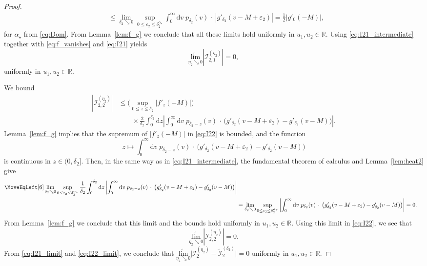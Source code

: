 \documentclass[oneside,final,11pt]{amsart}
\theoremstyle{definition}
\renewcommand{\d}{\mathrm{d}}
\newcommand{\mylim}[1]{\underset{#1}{\wt{\mathrm{lim}}}}
\newcommand{\R}{\mathbb{R}}
\newcommand{\1}[1]{\mathbf{1}_{#1}}
\newcommand{\eps}{\varepsilon}
\newcommand{\wt}{\widetilde}
\newcommand{\CI}{\mathcal{I}}
\numberwithin{equation}{section}
\begin{document}
\begin{proof}
\begin{equation}
\begin{split}
		&\leq \lim_{\delta_2 \searrow 0} \sup_{0 \leq \eps_2 \leq \delta_2^{\alpha_\star}} \int_{0}^{\infty} \d v\;  p_{\delta_2}(v) \,\cdot\, |g'_{\delta_2}(v - M + \eps_2)| = \frac{1}{2} |g'_{0}(- M)|,
	\end{split}\label{eq:I21_intermediate}
\end{equation}
for $\alpha_\star$ from \eqref{eq:Dom}. From Lemma~\ref{lem:f_g} we conclude that all these limits hold uniformly in $u_1, u_2 \in \R$. Using \eqref{eq:I21_intermediate} together with \eqref{eq:f_vanishes} and \eqref{eq:I21} yields
\begin{equation}\label{eq:I21_limit}
	\mylim{\eta_2 \searrow 0} |\CI^{(\eta_2)}_{2,1}| = 0,
\end{equation}
uniformly in $u_1, u_2 \in \R$.

\smallskip
\noindent{\bf The term $\CI^{(\eta_2)}_{2,2}$.} We bound
\begin{equation}\label{eq:I22}
\begin{split}
	|\CI^{(\eta_2)}_{2, 2}| &\leq \Big( \sup_{0 \leq z \leq \delta_2} |f'_z(-M)|\Big)\\
	&\qquad\times \frac{2}{\delta_2} \int_{0}^{\delta_2}\!\!\! \d z \left|\int_{0}^{\infty}\!\!\! \d v\; p_{\delta_2 - z}(v) \,\cdot\, \bigl(g'_{\delta_2}(v - M + \eps_2) - g'_{\delta_2}(v - M)\bigr)\right|.
\end{split}
\end{equation}
Lemma~\ref{lem:f_g} implies that the supremum of $|f'_z(-M)|$ in \eqref{eq:I22} is bounded, and the function
\begin{equation}
	z  \mapsto  \int_{0}^{\infty} \d v\;  p_{\delta_2 - z}(v) \,\cdot\, \bigl(g'_{\delta_2}(v - M + \eps_2) - g'_{\delta_2}(v - M)\bigr)
\end{equation}
is continuous in $z \in (0, \delta_2]$. Then, in the same way as in \eqref{eq:I21_intermediate}, the fundamental theorem of calculus and Lemma~\ref{lem:heat2} give
\begin{align}
\MoveEqLeft[6]
	\lim_{\delta_2 \searrow 0} \sup_{0 \leq \eps_2 \leq \delta_2^{\alpha_\star}} \frac{1}{\delta_2} \int_{0}^{\delta_2} \d z \left|\int_{0}^{\infty} \d v\; p_{\delta_2 - z}(v) \,\cdot\, \bigl(g'_{\delta_2}(v - M + \eps_2) - g'_{\delta_2}(v - M)\bigr)\right|\\
	&= \lim_{\delta_2 \searrow 0} \sup_{0 \leq \eps_2 \leq \delta_2^{\alpha_\star}} \left|\int_{0}^{\infty} \d v\; p_{\delta_2}(v) \,\cdot\, \bigl(g'_{\delta_2}(v - M + \eps_2) - g'_{\delta_2}(v - M)\bigr)\right| = 0.
\end{align}
From Lemma~\ref{lem:f_g} we conclude that this limit and the bounds hold uniformly in $u_1, u_2 \in \R$. Using this limit in \eqref{eq:I22}, we see that
\begin{equation}\label{eq:I22_limit}
	\mylim{\eta_2 \searrow 0} |\CI^{(\eta_2)}_{2,2}| = 0.
\end{equation}
From \eqref{eq:I21_limit} and \eqref{eq:I22_limit}, we conclude that $\mylim{\eta_2 \searrow 0} \bigl|\CI^{(\eta_2)}_2 - \wt{\CI}^{(\delta_2)}_2 \bigr| = 0$ uniformly in $u_1, u_2 \in \R$.


\end{proof}
\end{document}
